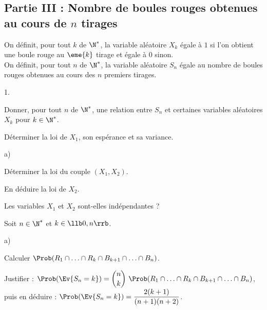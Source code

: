 \documentclass[11pt]{article}%
\begin{document}
\subsection*{Partie III : Nombre de boules rouges obtenues au cours de 
$n$ tirages}

\noindent 
On définit, pour tout $k$ de $\N^*$, la variable aléatoire $X_k$ égale
à $1$ si l'on obtient une boule rouge au $\eme{k}$ tirage et égale à
$0$ sinon.\\
On définit, pour tout $n$ de $\N^*$, la variable aléatoire $S_n$ égale
au nombre de boules rouges obtenues au cours des $n$ premiers tirages.
\begin{noliste}{1.}
  \setcounter{enumi}{4}
\item Donner, pour tout $n$ de $\N^*$, une relation entre $S_n$ et
  certaines variables aléatoires $X_k$ pour $k \in \N^*$.
  
  

\item Déterminer la loi de $X_1$, son espérance et sa variance.

  

\item
  \begin{noliste}{a)}
  \item Déterminer la loi du couple $(X_1, X_2)$.

    

  \item En déduire la loi de $X_2$.

    

  \item Les variables $X_1$ et $X_2$ sont-elles indépendantes ?

    
  \end{noliste}

\item Soit $n \in \N^*$ et $k \in \llb 0, n \rrb$.
  \begin{noliste}{a)}
  \item Calculer $\Prob(R_1 \cap \ldots \cap R_k \cap B_{k+1} \cap
    \ldots \cap B_n)$.

    




  \item Justifier : $\Prob(\Ev{S_n = k}) = \dbinom{n}{k} \ \Prob(R_1
    \cap \ldots \cap R_k \cap B_{k+1} \cap \ldots \cap B_n)$,\\
    puis en déduire : $\Prob(\Ev{S_n = k}) =
    \dfrac{2(k+1)}{(n+1)(n+2)}$.


\end{noliste}
\end{noliste}
\end{document}
